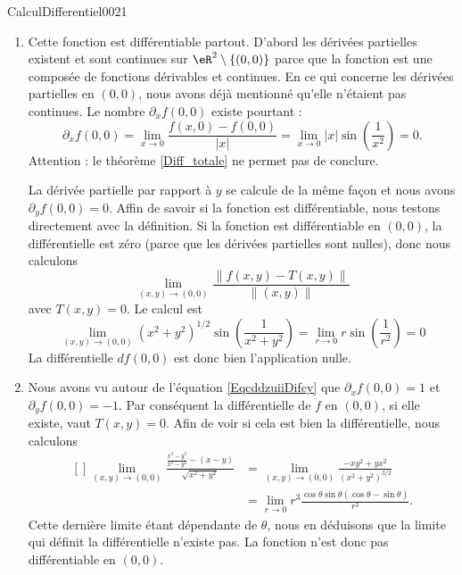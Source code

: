 \begin{corrige}{CalculDifferentiel0021}

	\begin{enumerate}
		\item
			Cette fonction est différentiable partout. D'abord les dérivées partielles existent et sont continues sur $\eR^2\setminus\{ (0,0) \}$ parce que la fonction est une composée de fonctions dérivables et continues. En ce qui concerne les dérivées partielles en $(0,0)$, nous avons déjà mentionné qu'elle n'étaient pas continues. Le nombre $\partial_xf(0,0)$ existe pourtant :
			\begin{equation}
				\partial_xf(0,0)=\lim_{x\to 0} \frac{ f(x,0)-f(0,0) }{ | x | }=\lim_{x\to 0} | x |\sin\left( \frac{1}{ x^2 } \right)=0.
			\end{equation}
			Attention : le théorème \ref{Diff_totale} ne permet pas de conclure. 

			La dérivée partielle par rapport à $y$ se calcule de la même façon et nous avons $\partial_yf(0,0)=0$. Affin de savoir si la fonction est différentiable, nous testons directement avec la définition. Si la fonction est différentiable en $(0,0)$, la différentielle est zéro (parce que les dérivées partielles sont nulles), donc nous calculons
			\begin{equation}
				\lim_{(x,y)\to(0,0)}\frac{ \| f(x,y)-T(x,y) \| }{ \| (x,y) \| }
			\end{equation}
			avec $T(x,y)=0$. Le calcul est
			\begin{equation}
				\lim_{(x,y)\to(0,0)}(x^2+y^2)^{1/2}\sin\left( \frac{1}{ x^2+y^2 } \right)=\lim_{r\to 0} r\sin\left( \frac{1}{ r^2 } \right)=0
			\end{equation}
			La différentielle $df(0,0)$ est donc bien l'application nulle.

		\item
			Nous avons vu autour de l'équation \eqref{EqcddzuiiDifcy} que $\partial_xf(0,0)=1$ et $\partial_yf(0,0)=-1$. Par conséquent la différentielle de $f$ en $(0,0)$, si elle existe, vaut $T(x,y)=0$. Afin de voir si cela est bien la différentielle, nous calculons
			\begin{equation}
				\begin{aligned}[]
					\lim_{(x,y)\to(0,0)}\frac{ \frac{ x^3-y^3 }{ x^2-y^2 }-(x-y) }{ \sqrt{x^2+y^2} }&=\lim_{(x,y)\to(0,0)}\frac{ -xy^2+yx^2 }{ (x^2+y^2)^{3/2} }\\
					&=\lim_{r\to 0} r^3\frac{ \cos\theta\sin\theta(\cos\theta-\sin\theta) }{ r^3 }.
				\end{aligned}
			\end{equation}
			Cette dernière limite étant dépendante de $\theta$, nous en déduisons que la limite qui définit la différentielle n'existe pas. La fonction n'est donc pas différentiable en $(0,0)$.
	\end{enumerate}
	

\end{corrige}
